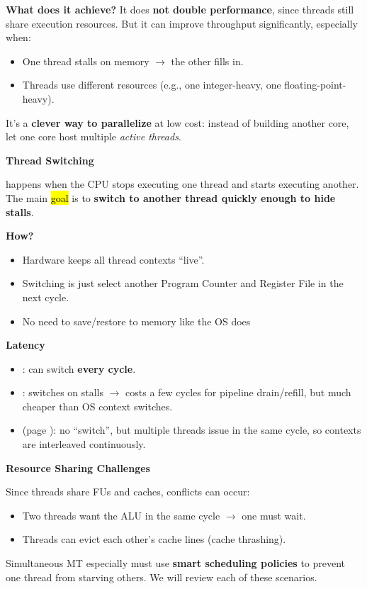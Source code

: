 \highspace
\textcolor{Green3}{ \textbf{What does it achieve?}} It does \textbf{not double performance}, since threads still share execution resources. But it can improve throughput significantly, especially when:
\begin{itemize}
    \item One thread stalls on memory $\rightarrow$ the other fills in.
    \item Threads use different resources (e.g., one integer-heavy, one floating-point-heavy).
\end{itemize}
It's a \textbf{clever way to parallelize} at low cost: instead of building another core, let one core host multiple \emph{active threads}.

\highspace
\begin{flushleft}
    \textcolor{Green3}{ \textbf{Thread Switching}}
\end{flushleft}
 happens when the CPU stops executing one thread and starts executing another. The main \hl{goal} is to \textbf{switch to another thread quickly enough to hide stalls}.

\highspace
\textcolor{Green3}{ \textbf{How?}}
\begin{itemize}
    \item Hardware keeps all thread contexts ``live''.
    \item Switching is just select another Program Counter and Register File in the next cycle.
    \item No need to save/restore to memory like the OS does
\end{itemize}
\textcolor{Red2}{ \textbf{Latency}}
\begin{itemize}
    \item {}: can switch \textbf{every cycle}.
    \item {}: switches on stalls $\rightarrow$ costs a few cycles for pipeline drain/refill, but much cheaper than OS context switches.
    \item {} (page \pageref{}): no ``switch'', but multiple threads issue in the same cycle, so contexts are interleaved continuously.
\end{itemize}

\highspace
\begin{flushleft}
    \textcolor{Red2}{ \textbf{Resource Sharing Challenges}}
\end{flushleft}
Since threads share FUs and caches, conflicts can occur:
\begin{itemize}
    \item Two threads want the ALU in the same cycle $\rightarrow$ one must wait.
    \item Threads can evict each other's cache lines (cache thrashing).
\end{itemize}
Simultaneous MT especially must use \textbf{smart scheduling policies} to prevent one thread from starving others. We will review each of these scenarios.